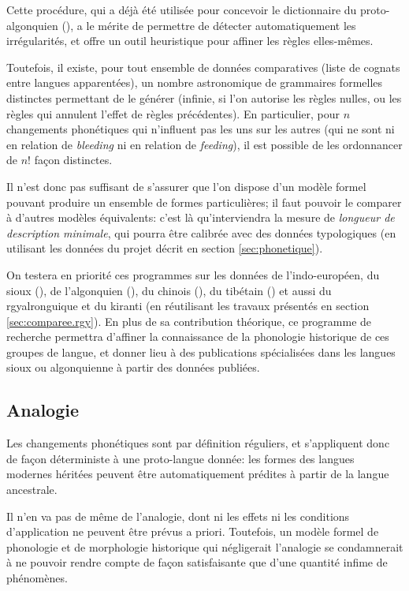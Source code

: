\documentclass[oldfontcommands,oneside,a4paper,11pt]{article}
\begin{document}
Cette procédure, qui a déjà été utilisée pour concevoir le dictionnaire du proto-algonquien (\citealt{hewson93proto}), a le mérite de permettre de détecter automatiquement les irrégularités, et offre un outil heuristique pour affiner les règles elles-mêmes.

Toutefois, il existe, pour tout ensemble de données comparatives (liste de cognats entre langues apparentées), un nombre astronomique de grammaires formelles distinctes permettant de le générer (infinie, si l'on autorise les règles nulles, ou les règles qui annulent l'effet de règles précédentes). En particulier, pour $n$ changements phonétiques qui n'influent pas les uns sur les autres (qui ne sont ni en relation de \textit{bleeding} ni en relation de \textit{feeding}), il est possible de les ordonnancer de $n!$ façon distinctes.

Il n'est donc pas suffisant de s'assurer que l'on dispose d'un modèle formel pouvant produire un ensemble de formes particulières; il faut pouvoir le comparer à d'autres modèles équivalents: c'est là qu'interviendra la mesure de \textit{longueur de description minimale}, qui pourra être calibrée avec des données typologiques (en utilisant les données du projet décrit en section \ref{sec:phonetique}).

On testera en priorité ces programmes sur les données de l'indo-européen, du sioux (\citealt{csd2006}), de l'algonquien (\citealt{hewson11roots}), du chinois (\citealt{bs14oc}), du tibétain (\citealt{jacques14cone}) et aussi du rgyalronguique et du kiranti (en réutilisant les travaux présentés en section \ref{sec:comparee.rgy}). En plus de sa contribution théorique, ce programme de recherche permettra d'affiner la connaissance de la phonologie historique de ces groupes de langue, et donner lieu à des publications spécialisées dans les langues sioux ou algonquienne à partir des données publiées.

\subsection{Analogie}
Les changements phonétiques sont par définition réguliers, et s'appliquent donc de façon déterministe à une proto-langue donnée: les formes des langues modernes héritées peuvent être automatiquement prédites à partir de la langue ancestrale.

Il n'en va pas de même de l'analogie, dont ni les effets ni les conditions d'application ne peuvent être prévus a priori. Toutefois, un modèle formel de phonologie et de morphologie historique qui négligerait l'analogie se condamnerait à ne pouvoir rendre compte de façon satisfaisante que d'une quantité infime de phénomènes.  
\end{document}
